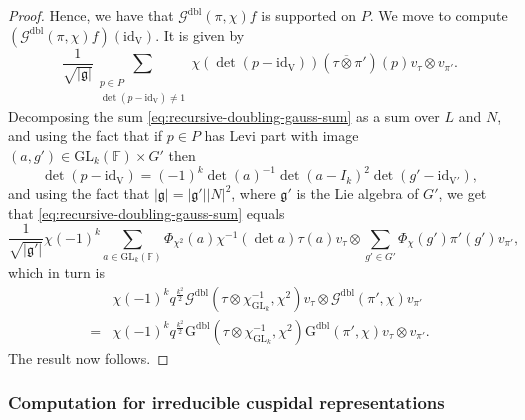 \documentclass[12pt, reqno]{amsart}
\theoremstyle{definition}
\theoremstyle{definition}
\theoremstyle{definition}
\newcommand{\idmap}{\mathrm{id}}
\newcommand{\sizeof}[1]{\left|#1\right|}
\newcommand{\hermitianSpace}{\mathrm{V}}
\newcommand{\GL}{\mathrm{GL}}
\newcommand{\finiteField}{\mathbb{F}}
\newcommand{\dblGaussSum}[2]{\mathcal{G}^{\mathrm{dbl}}\left(#1, #2\right)}
\newcommand{\dblGaussSumScalar}[2]{\mathrm{G}^{\mathrm{dbl}}\left(#1, #2\right)}
\newcommand{\lieAlgebra}{\mathfrak{g}}
\begin{document}
\begin{proof}
	Hence, we have that $\dblGaussSum{\pi}{\chi} f$ is supported on $P$. We move to compute $\left(\dblGaussSum{\pi}{\chi} f\right)\left(\idmap_{\hermitianSpace}\right)$. It is given by
	\begin{equation}\label{eq:recursive-doubling-gauss-sum}
		\frac{1}{\sqrt{\sizeof{\lieAlgebra}}} \sum_{\substack{p \in P\\
				\det\left(p - \idmap_{\hermitianSpace}\right) \ne 1}} \chi\left(\det\left(p - \idmap_{\hermitianSpace}\right)\right) \left(\tau \overline{\otimes} \pi'\right)\left(p\right) v_{\tau} \otimes v_{\pi'}.
	\end{equation}
	Decomposing the sum \eqref{eq:recursive-doubling-gauss-sum} as a sum over $L$ and $N$, and using the fact that if $p \in P$ has Levi part with image $\left(a, g'\right) \in \GL_k\left(\finiteField\right) \times G'$ then $$\det\left(p - \idmap_{\hermitianSpace}\right) = \left(-1\right)^k \det\left(a\right)^{-1}\det\left(a - I_k\right)^2 \det\left( g' - \idmap_{\hermitianSpace'}\right),$$
	and using the fact that $\sizeof{\lieAlgebra} = \sizeof{\lieAlgebra'} \sizeof{N}^2$, where $\lieAlgebra'$ is the Lie algebra of $G'$,
	we get that \eqref{eq:recursive-doubling-gauss-sum} equals
	\begin{equation}
		\frac{1}{\sqrt{\sizeof{\lieAlgebra'}}} \chi\left(-1\right)^k \sum_{a \in \GL_k\left(\finiteField\right)} \Phi_{\chi^2}\left(a\right) \chi^{-1}\left(\det a\right) \tau\left(a\right) v_{\tau} \otimes \sum_{g' \in G'} \Phi_{\chi}\left(g'\right) \pi'\left(g'\right) v_{\pi'},
	\end{equation}
	which in turn is
	\begin{align*}
		&\chi\left(-1\right)^k q^{\frac{k^2}{2}} \dblGaussSum{\tau \otimes \chi_{\GL_k}^{-1}}{\chi^2} v_{\tau} \otimes \dblGaussSum{\pi'}{\chi} v_{\pi'} \\
		=& \chi\left(-1\right)^k q^{\frac{k^2}{2}} \dblGaussSumScalar{\tau \otimes \chi_{\GL_k}^{-1}}{\chi^2} \dblGaussSumScalar{\pi'}{\chi} v_{\tau} \otimes v_{\pi'}.
	\end{align*}
	The result now follows.
\end{proof}

\subsubsection{Computation for irreducible cuspidal representations}
\end{document}
